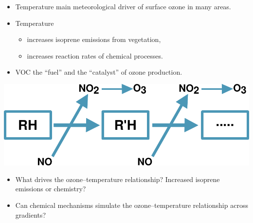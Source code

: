 \begin{BlueBox}
    \vskip-1cm
    \begin{block}{}
        \begin{itemize}
            \item Temperature main meteorological driver of surface ozone in many areas. \vspace{12mm}
            \item Temperature \vspace{6mm}
                \begin{itemize}
                    \item increases isoprene emissions from vegetation, \vspace{4mm}
                    \item increases reaction rates of chemical processes.  \vspace{12mm}
                \end{itemize}
            \item VOC the ``fuel'' and  the ``catalyst'' of ozone production. \vspace{12mm}
        \end{itemize}
        \vspace{5mm}
        \includegraphics[width=\textwidth]{VOC_Oxidation} \vspace{5mm}
        \begin{itemize}
            \item What drives the ozone--temperature relationship? Increased isoprene emissions or chemistry? \vspace{12mm}
            \item Can chemical mechanisms simulate the ozone--temperature relationship across  gradients? \vspace{12mm}
        \end{itemize}
    \end{block}
\end{BlueBox}
